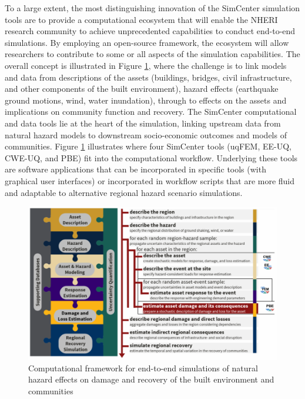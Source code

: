 To a large extent, the most distinguishing innovation of the SimCenter simulation tools are to provide a computational ecosystem that will enable the NHERI research community to achieve unprecedented capabilities to conduct end-to-end simulations. By employing an open-source framework, the ecosystem will allow researchers to contribute to some or all aspects of the simulation capabilities. The overall concept is illustrated in Figure \ref{fig:intro_CompFramework}, where the challenge is to link models and data from descriptions of the assets (buildings, bridges, civil infrastructure, and other components of the built environment), hazard effects (earthquake ground motions, wind, water inundation), through to effects on the assets and implications on community function and recovery. The SimCenter computational and data tools lie at the heart of the simulation, linking upstream data from natural hazard models to downstream socio-economic outcomes and models of communities. Figure \ref{fig:intro_CompFramework} illustrates where four SimCenter tools (uqFEM, EE-UQ, CWE-UQ, and PBE) fit into the computational workflow. Underlying these tools are software applications that can be incorporated in specific tools (with graphical user interfaces) or incorporated in workflow scripts that are more fluid and adaptable to alternative regional hazard scenario simulations. 

\begin{figure}[htb]
    \centering
    \includegraphics[width=1.0\textwidth, angle = 0]{Figures/CompFramework.pdf}
    \caption{Computational framework for end-to-end simulations of natural hazard effects on damage and recovery of the built environment and communities}
    \label{fig:intro_CompFramework}
\end{figure}

